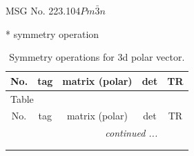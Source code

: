 \documentclass[fleqn,8pt]{jsarticle}
\begin{document}
\setcounter{MaxMatrixCols}{32}

\renewcommand{\tablename}{Table~}
\renewcommand{\figurename}{Figure~}
\begin{center}
\LARGE
MSG No. 223.104\quad$Pm\bar{3}n$
\end{center}
* symmetry operation
\renewcommand{\arraystretch}{1.3}
\begin{longtable}{ccccc}
\caption{Symmetry operations for 3d polar vector.}
 \\
 \hline \hline
No. & tag & matrix (polar) & det & TR \\ \hline \endfirsthead

\multicolumn{4}{l}{\tablename\ \thetable{}} \\
 \hline \hline
No. & tag & matrix (polar) & det & TR \\ \hline \endhead

 \hline \hline
\multicolumn{4}{r}{\footnotesize\it continued ...} \\ \endfoot

 \hline \hline
\multicolumn{4}{r}{} \\ \endlastfoot


\end{longtable}
\end{document}
